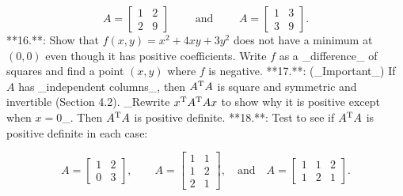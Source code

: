 \[A=\begin{bmatrix}1&2\\ 2&9\end{bmatrix}\qquad\text{ and }\qquad A=\begin{bmatrix}1&3\\ 3&9\end{bmatrix}.\]
**16.**: Show that \(f(x,y)=x^{2}+4xy+3y^{2}\) does not have a minimum at \((0,0)\) even though it has positive coefficients. Write \(f\) as a _difference_ of squares and find a point \((x,y)\) where \(f\) is negative.
**17.**: (_Important_) If \(A\) has _independent columns_, then \(A^{\rm T}A\) is square and symmetric and invertible (Section 4.2). _Rewrite \(x^{\rm T}A^{\rm T}Ax\) to show why it is positive except when \(x=0\)_. Then \(A^{\rm T}A\) is positive definite.
**18.**: Test to see if \(A^{\rm T}A\) is positive definite in each case:

\[A=\begin{bmatrix}1&2\\ 0&3\end{bmatrix},\qquad A=\begin{bmatrix}1&1\\ 1&2\\ 2&1\end{bmatrix},\quad\text{and}\quad A=\begin{bmatrix}1&1&2\\ 1&2&1\end{bmatrix}.\]